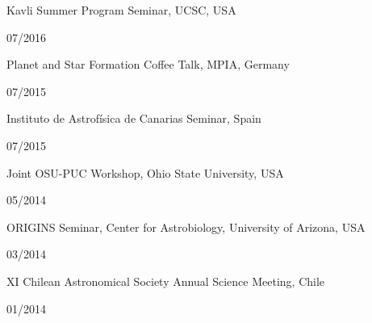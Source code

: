 \documentclass[11pt, a4paper]{article} %
\begin{document}
\begin{minipage}[t]{0.7\textwidth}
\begin{flushleft}%
  \setlength{\leftskip}{0.2cm}%
Kavli Summer Program Seminar, UCSC, USA
\end{flushleft}
\end{minipage}
\begin{minipage}[t]{0.3\textwidth}
\hfill 07/2016
\end{minipage}
\begin{minipage}[t]{0.7\textwidth}
\begin{flushleft}%
  \setlength{\leftskip}{0.2cm}%
Planet and Star Formation Coffee Talk, MPIA, Germany
\end{flushleft}
\end{minipage}
\begin{minipage}[t]{0.3\textwidth}
\hfill 07/2015
\end{minipage}
\begin{minipage}[t]{0.7\textwidth}
\begin{flushleft}%
  \setlength{\leftskip}{0.2cm}%
Instituto de Astrof\'isica de Canarias Seminar, Spain
\end{flushleft}
\end{minipage}
\begin{minipage}[t]{0.3\textwidth}
\hfill 07/2015
\end{minipage}
\begin{minipage}[t]{0.7\textwidth}
\begin{flushleft}%
  \setlength{\leftskip}{0.2cm}%
Joint OSU-PUC Workshop, Ohio State University, USA
\end{flushleft}
\end{minipage}
\begin{minipage}[t]{0.3\textwidth}
\hfill 05/2014
\end{minipage}

\begin{minipage}[t]{0.7\textwidth}
\begin{flushleft}%
  \setlength{\leftskip}{0.2cm}%
ORIGINS Seminar, Center for Astrobiology, University of Arizona, USA
\end{flushleft}
\end{minipage}
\begin{minipage}[t]{0.3\textwidth}
\hfill 03/2014
\end{minipage}

\begin{minipage}[t]{0.7\textwidth}
\begin{flushleft}%
  \setlength{\leftskip}{0.2cm}%
XI Chilean Astronomical Society Annual Science Meeting, Chile 
\end{flushleft}
\end{minipage}
\begin{minipage}[t]{0.3\textwidth}
\hfill 01/2014
\end{minipage}
\end{document}
